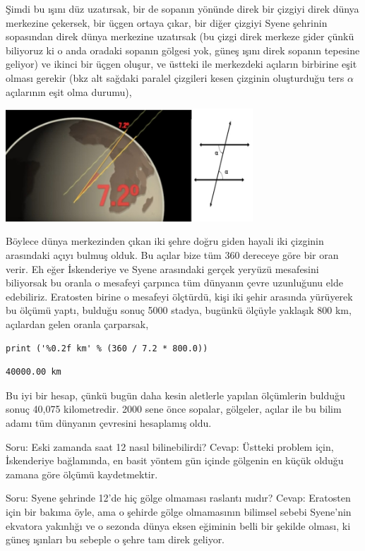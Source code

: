 \documentclass[12pt,fleqn]{article}\usepackage{../../common}
\begin{document}
Şimdi bu ışını düz uzatırsak, bir de sopanın yönünde direk bir çizgiyi direk
dünya merkezine çekersek, bir üçgen ortaya çıkar, bir diğer çizgiyi Syene
şehrinin sopasından direk dünya merkezine uzatırsak (bu çizgi direk merkeze
gider çünkü biliyoruz ki o anda oradaki sopanın gölgesi yok, güneş ışını direk
sopanın tepesine geliyor) ve ikinci bir üçgen oluşur, ve üstteki ile merkezdeki
açıların birbirine eşit olması gerekir (bkz alt sağdaki paralel çizgileri kesen
çizginin oluşturduğu ters $\alpha$ açılarının eşit olma durumu),

\includegraphics[width=25em]{circum2.jpg}

Böylece dünya merkezinden çıkan iki şehre doğru giden hayali iki çizginin
arasındaki açıyı bulmuş olduk. Bu açılar bize tüm 360 dereceye göre bir oran
verir. Eh eğer İskenderiye ve Syene arasındaki gerçek yeryüzü mesafesini
biliyorsak bu oranla o mesafeyi çarpınca tüm dünyanın çevre uzunluğunu elde
edebiliriz. Eratosten birine o mesafeyi ölçtürdü, kişi iki şehir arasında
yürüyerek bu ölçümü yaptı, bulduğu sonuç 5000 stadya, bugünkü ölçüyle yaklaşık
800 km, açılardan gelen oranla çarparsak,

\begin{verbatim}
print ('%0.2f km' % (360 / 7.2 * 800.0))
\end{verbatim}

\begin{verbatim}
40000.00 km
\end{verbatim}

Bu iyi bir hesap, çünkü bugün daha kesin aletlerle yapılan ölçümlerin bulduğu
sonuç 40,075 kilometredir. 2000 sene önce sopalar, gölgeler, açılar ile bu bilim
adamı tüm dünyanın çevresini hesaplamış oldu.

Soru: Eski zamanda saat 12 nasıl bilinebilirdi? Cevap: Üstteki problem için,
İskenderiye bağlamında, en basit yöntem gün içinde gölgenin en küçük olduğu
zamana göre ölçümü kaydetmektir. 

Soru: Syene şehrinde 12'de hiç gölge olmaması raslantı mıdır? Cevap: Eratosten
için bir bakıma öyle, ama o şehirde gölge olmamasının bilimsel sebebi Syene'nin
ekvatora yakınlığı ve o sezonda dünya eksen eğiminin belli bir şekilde olması,
ki güneş ışınları bu sebeple o şehre tam direk geliyor.
\end{document}
